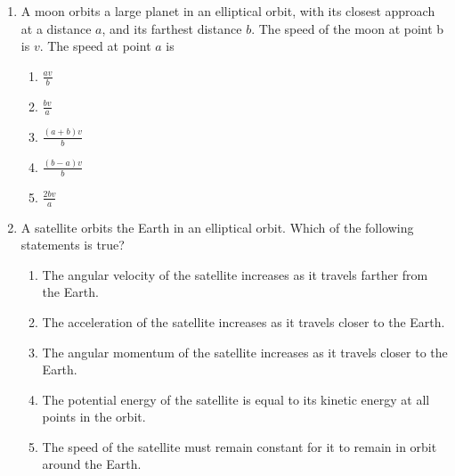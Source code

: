 \documentclass[12pt]{article}
\begin{document}
\begin{enumerate}[leftmargin=50pt,label=\underline{\hspace{0.4in}} \arabic*.]
\item A moon orbits a large planet in an elliptical orbit, with its closest
  approach at a distance $a$, and its farthest distance $b$. The speed of the
  moon at point b is $v$. The speed at point $a$ is
  \begin{enumerate}[noitemsep,topsep=0pt,leftmargin=18pt]  
  \item $\displaystyle\frac{av}{b}$
  \item $\displaystyle\frac{bv}{a}$
  \item $\displaystyle\frac{(a+b)v}{b}$
  \item $\displaystyle\frac{(b-a)v}{b}$
  \item $\displaystyle\frac{2bv}{a}$
  \end{enumerate}


\item A satellite orbits the Earth in an elliptical orbit. Which of the
  following statements is true?
  \begin{enumerate}[noitemsep,topsep=0pt,leftmargin=18pt]  
  \item The angular velocity of the satellite increases as it travels
    farther from the Earth.
  \item The acceleration of the satellite increases as it travels closer
    to the Earth.
  \item The angular momentum of the satellite increases as it travels
    closer to the Earth.
  \item The potential energy of the satellite is equal to its kinetic
    energy at all points in the orbit.
  \item The speed of the satellite must remain constant for it to remain
    in orbit around the Earth.
  \end{enumerate}

  \begin{center}
  \end{center}
  

\end{enumerate}
\end{document}
